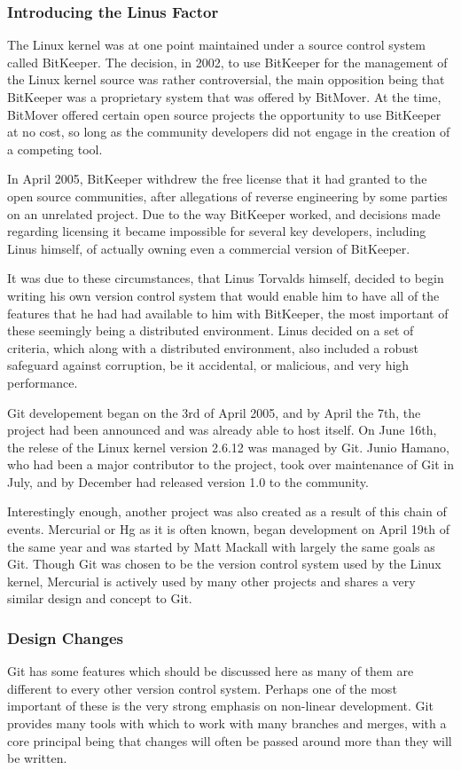 \subsubsection{Introducing the Linus Factor}
The Linux kernel was at one point maintained under a source control system called BitKeeper.  The decision, in 2002, to use BitKeeper for the management of the Linux kernel source was rather controversial, the main opposition being that BitKeeper was a proprietary system that was offered by BitMover.  At the time, BitMover offered certain open source projects the opportunity to use BitKeeper at no cost, so long as the community developers did not engage in the creation of a competing tool.

In April 2005, BitKeeper withdrew the free license that it had granted to the open source communities, after allegations of reverse engineering by some parties on an unrelated project.  Due to the way BitKeeper worked, and decisions made regarding licensing it became impossible for several key developers, including Linus himself, of actually owning even a commercial version of BitKeeper.

It was due to these circumstances, that Linus Torvalds himself, decided to begin writing his own version control system that would enable him to have all of the features that he had had available to him with BitKeeper, the most important of these seemingly being a distributed environment.  Linus decided on a set of criteria, which along with a distributed environment, also included a robust safeguard against corruption, be it accidental, or malicious, and very high performance.

Git developement began on the 3rd of April 2005, and by April the 7th, the project had been announced and was already able to host itself.  On June 16th, the relese of the Linux kernel version 2.6.12 was managed by Git.  Junio Hamano, who had been a major contributor to the project, took over maintenance of Git in July, and by December had released version 1.0 to the community.

Interestingly enough, another project was also created as a result of this chain of events.  Mercurial or Hg as it is often known, began development on April 19th of the same year and was started by Matt Mackall with largely the same goals as Git.  Though Git was chosen to be the version control system used by the Linux kernel, Mercurial is actively used by many other projects and shares a very similar design and concept to Git.

\subsubsection{Design Changes}
Git has some features which should be discussed here as many of them are different to every other version control system.  Perhaps one of the most important of these is the very strong emphasis on non-linear development.  Git provides many tools with which to work with many branches and merges, with a core principal being that changes will often be passed around more than they will be written.

